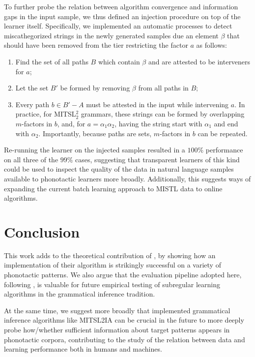 \documentclass[11pt]{article}
\begin{document}
   To further probe the relation between algorithm convergence and information gaps in the input sample,  we thus defined an injection procedure on top of the learner itself.
   Specifically, we implemented an automatic processes to detect miscathegorized strings in the newly generated samples due an element $\beta$ that should have been removed from the tier restricting the factor $a$ as follows:
   
   \begin{enumerate}
        \item Find the set of all paths $B$ which contain $\beta$ and are attested to be interveners for $a$;
        \item Let the set $B'$ be formed by removing $\beta$ from all paths in $B$;
        \item Every path $b \in B' - A$ must be attested in the input while intervening $a$. In practice, for MITSL$_2^2$ grammars, these strings can be formed by overlapping $m$-factors in $b$, and, for $a = \alpha_1 \alpha_2$, having the string start with $\alpha_1$ and end with $\alpha_2$. Importantly, because paths are sets, $m$-factors in $b$ can be repeated.
    \end{enumerate}
   
    Re-running the learner on the injected samples resulted in a $100\%$ performance on all three of the $99\%$ cases, suggesting that transparent learners of this kind could be used to inspect the quality of the data in natural language samples available to phonotactic learners more broadly.
    Additionally, this suggests ways of expanding the current batch learning approach to MISTL data to online algorithms.
 
 \section{Conclusion}
This work adds to the theoretical contribution of \citep{de2021learning}, by showing how an implementation of their algorithm is strikingly successful on a variety of phonotactic patterns.
We also argue that the evaluation pipeline adopted here, following \citep{aksenova2020tool}, is valuable for future empirical testing of subregular learning algorithms in the grammatical inference tradition.
 
  At the same time, we suggest more broadly that implemented grammatical inference algorithms like MITSL2IA can be crucial in the future to more deeply probe how/whether sufficient information about target patterns appears in phonotactic corpora, contributing to the study of the relation between data and learning performance both in humans and machines.






\end{document}
